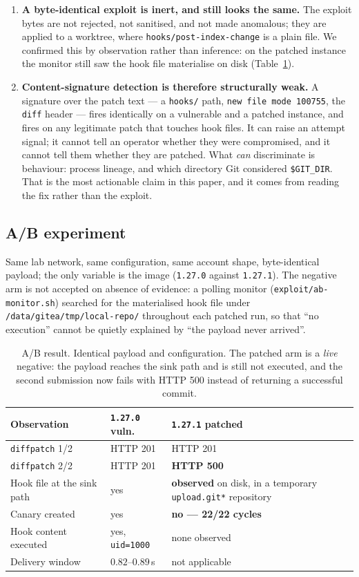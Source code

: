 \begin{enumerate}
\item \textbf{A byte-identical exploit is inert, and still looks the same.} The
exploit bytes are not rejected, not sanitised, and not made anomalous; they are
applied to a worktree, where \texttt{hooks/post-index-change} is a plain file.
We confirmed this by observation rather than inference: on the patched instance
the monitor still saw the hook file materialise on disk
(Table~\ref{tab:ab}).
\item \textbf{Content-signature detection is therefore structurally weak.} A
signature over the patch text --- a \texttt{hooks/} path, \texttt{new file mode
100755}, the \texttt{diff} header --- fires identically on a vulnerable and a
patched instance, and fires on any legitimate patch that touches hook files. It
can raise an attempt signal; it cannot tell an operator whether they were
compromised, and it cannot tell them whether they are patched. What \emph{can}
discriminate is behaviour: process lineage, and which directory Git considered
\texttt{\$GIT\_DIR}. That is the most actionable claim in this paper, and it
comes from reading the fix rather than the exploit.
\end{enumerate}

\subsection{A/B experiment}

Same lab network, same configuration, same account shape, byte-identical payload;
the only variable is the image (\texttt{1.27.0} against \texttt{1.27.1}). The
negative arm is not accepted on absence of evidence: a polling monitor
(\texttt{exploit/ab-monitor.sh}) searched for the materialised hook file under
\texttt{/data/gitea/tmp/local-repo/} throughout each patched run, so that ``no
execution'' cannot be quietly explained by ``the payload never arrived''.

\begin{table}[t]
\centering
\footnotesize
\begin{tabular}{@{}p{2.7cm}p{1.9cm}p{2.9cm}@{}}
\toprule
Observation & \texttt{1.27.0} vuln. & \texttt{1.27.1} patched \\
\midrule
\texttt{diffpatch} 1/2 & HTTP 201 & HTTP 201 \\
\texttt{diffpatch} 2/2 & HTTP 201 & \textbf{HTTP 500} \\
Hook file at the sink path & yes & \textbf{observed} on disk, in a temporary
\texttt{upload.git*} repository \\
Canary created & yes & \textbf{no --- 22/22 cycles} \\
Hook content executed & yes, \texttt{uid=1000} & none observed \\
Delivery window & $0.82$--$0.89$\,s & not applicable \\
\bottomrule
\end{tabular}
\caption{A/B result. Identical payload and configuration. The patched arm is a
\emph{live} negative: the payload reaches the sink path and is still not
executed, and the second submission now fails with HTTP 500 instead of returning
a successful commit.}
\label{tab:ab}
\end{table}

